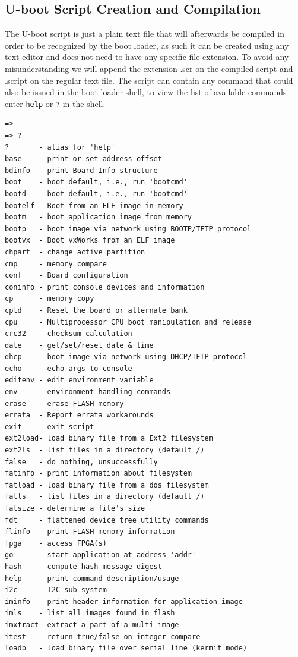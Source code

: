 \documentclass[11pt
  , a4paper
  , article
  , oneside
  , showtrims
]{memoir}
\begin{document}
\subsection{U-boot Script Creation and Compilation}
The U-boot script is just a plain text file that will afterwards be compiled in order to be recognized by the boot loader, as such it can be created using any text editor and does not need to have any specific file extension.
To avoid any misunderstanding we will append the extension .scr on the compiled script and .script on the regular text file.
The script can contain any command that could also be issued in the boot loader shell, to view the list of available commands enter \texttt{help} or \texttt{?} in the shell.

\begin{lstlisting}[style=termstyle]
=>
=> ?
?       - alias for 'help'
base    - print or set address offset
bdinfo  - print Board Info structure
boot    - boot default, i.e., run 'bootcmd'
bootd   - boot default, i.e., run 'bootcmd'
bootelf - Boot from an ELF image in memory
bootm   - boot application image from memory
bootp   - boot image via network using BOOTP/TFTP protocol
bootvx  - Boot vxWorks from an ELF image
chpart  - change active partition
cmp     - memory compare
conf    - Board configuration
coninfo - print console devices and information
cp      - memory copy
cpld    - Reset the board or alternate bank
cpu     - Multiprocessor CPU boot manipulation and release
crc32   - checksum calculation
date    - get/set/reset date & time
dhcp    - boot image via network using DHCP/TFTP protocol
echo    - echo args to console
editenv - edit environment variable
env     - environment handling commands
erase   - erase FLASH memory
errata  - Report errata workarounds
exit    - exit script
ext2load- load binary file from a Ext2 filesystem
ext2ls  - list files in a directory (default /)
false   - do nothing, unsuccessfully
fatinfo - print information about filesystem
fatload - load binary file from a dos filesystem
fatls   - list files in a directory (default /)
fatsize - determine a file's size
fdt     - flattened device tree utility commands
flinfo  - print FLASH memory information
fpga    - access FPGA(s)
go      - start application at address 'addr'
hash    - compute hash message digest
help    - print command description/usage
i2c     - I2C sub-system
iminfo  - print header information for application image
imls    - list all images found in flash
imxtract- extract a part of a multi-image
itest   - return true/false on integer compare
loadb   - load binary file over serial line (kermit mode)

\end{lstlisting}
\end{document}
